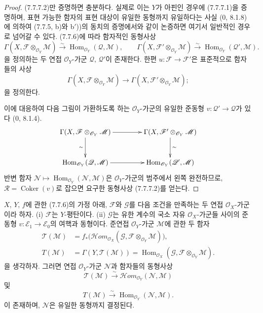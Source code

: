 \begin{proof}
(7.7.7.2)만 증명하면 충분하다. 실제로 이는 $Y$가 아핀인 경우에
(7.7.7.1)을 증명하며, 표현 가능한 함자의 표현 대상이 유일한 동형까지
유일하다는 사실 (0, 8.1.8)에 의하여 (7.7.5, b)와 b$'$))의 동치의
증명에서와 같이 논증하면 여기서 일반적인 경우로 넘어갈 수 있다.
(7.7.6)에 따라 함자적인 동형사상
\[
  \Gamma(X,\mathscr F\otimes_{\mathscr O_Y}\mathscr M)
  \xrightarrow{\sim}
  \operatorname{Hom}_{\mathscr O_Y}(\mathscr Q,\mathscr M),
  \qquad
  \Gamma(X,\mathscr F'\otimes_{\mathscr O_Y}\mathscr M)
  \xrightarrow{\sim}
  \operatorname{Hom}_{\mathscr O_Y}(\mathscr Q',\mathscr M).
\]
을 정의하는 두 연접 $\mathscr O_Y$-가군 $\mathscr Q$, $\mathscr Q'$이
존재한다. 한편 $u:\mathscr F\to\mathscr F'$은 표준적으로 함자들의 사상
\[
  \Gamma(X,\mathscr F\otimes_{\mathscr O_Y}\mathscr M)
  \longrightarrow
  \Gamma(X,\mathscr F'\otimes_{\mathscr O_Y}\mathscr M);
\]
을 정의한다.

이에 대응하여 다음 그림이 가환하도록 하는 $\mathscr O_Y$-가군의 유일한
준동형 $v:\mathscr Q'\to\mathscr Q$가 있다 (0, 8.1.4).
\[
\xymatrix@C=42pt@R=28pt{
  \Gamma(X,\mathscr F\otimes_{\mathscr O_Y}\mathscr M)
    \ar[r]\ar[d]_-{\sim}
  &
  \Gamma(X,\mathscr F'\otimes_{\mathscr O_Y}\mathscr M)
    \ar[d]^-{\sim}
  \\
  \operatorname{Hom}_{\mathscr O_Y}(\mathscr Q,\mathscr M)
    \ar[r]
  &
  \operatorname{Hom}_{\mathscr O_Y}(\mathscr Q',\mathscr M)
}
\]
반변 함자
$\mathscr N\mapsto\operatorname{Hom}_{\mathscr O_Y}(\mathscr N,\mathscr M)$은
$\mathscr O_Y$-가군의 범주에서 왼쪽 완전하므로,
$\mathscr R=\operatorname{Coker}(v)$로 잡으면 요구한 동형사상
(7.7.7.2)를 얻는다.
\end{proof}

\begin{corollary}[7.7.8]
$X$, $Y$, $f$에 관한 (7.7.6)의 가정 아래, $\mathscr F$와
$\mathscr G$를 다음 조건을 만족하는 두 연접 $\mathscr O_X$-가군이라
하자. (i) $\mathscr F$는 $Y$-평탄이다. (ii) $\mathscr G$는 유한 계수의
국소 자유 $\mathscr O_X$-가군들 사이의 준동형
$v:\mathscr E_1\to\mathscr E_0$의 여핵과 동형이다. 준연접
$\mathscr O_Y$-가군 $\mathscr M$에 관한 두 함자
\begin{align*}
  \mathscr T(\mathscr M)
  &=
  f_*
  \bigl(
    \mathscr{H}\!om_{\mathscr O_X}
      (\mathscr G,\mathscr F\otimes_{\mathscr O_Y}\mathscr M)
  \bigr),\\
  T(\mathscr M)
  &=
  \Gamma(Y,\mathscr T(\mathscr M))
  =
  \operatorname{Hom}_{\mathscr O_X}
    (\mathscr G,\mathscr F\otimes_{\mathscr O_Y}\mathscr M).
\end{align*}
을 생각하자. 그러면 연접 $\mathscr O_Y$-가군 $\mathscr N$과 함자들의
동형사상
\[
  \mathscr T(\mathscr M)
  \xrightarrow{\sim}
  \mathscr{H}\!om_{\mathscr O_Y}(\mathscr N,\mathscr M)
  \tag{7.7.8.1}\label{III.7.7.8.1.fr}
\]
및
\[
  T(\mathscr M)
  \xrightarrow{\sim}
  \operatorname{Hom}_{\mathscr O_Y}(\mathscr N,\mathscr M).
  \tag{7.7.8.2}\label{III.7.7.8.2.fr}
\]
이 존재하며, $\mathscr N$은 유일한 동형까지 결정된다.
\end{corollary}

